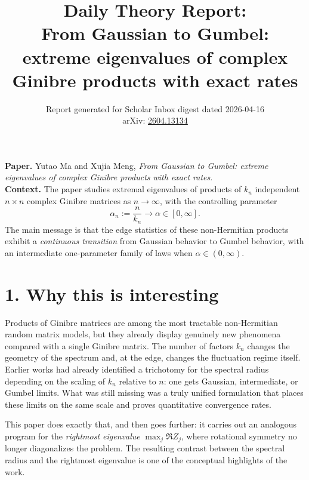 \documentclass[11pt]{article}
\title{\vspace{-1.5em}\textbf{Daily Theory Report:}\\[0.25em]
From Gaussian to Gumbel: extreme eigenvalues of complex Ginibre products with exact rates}
\author{Report generated for Scholar Inbox digest dated 2026-04-16\\arXiv: \href{https://arxiv.org/abs/2604.13134}{2604.13134}}
\date{}
\begin{document}
\maketitle
\thispagestyle{empty}

\textbf{Paper.} Yutao Ma and Xujia Meng, \emph{From Gaussian to Gumbel: extreme eigenvalues of complex Ginibre products with exact rates}.\\
\textbf{Context.} The paper studies extremal eigenvalues of products of $k_n$ independent $n\times n$ complex Ginibre matrices as $n\to\infty$, with the controlling parameter
\[
\alpha_n:=\frac{n}{k_n}\longrightarrow \alpha\in[0,\infty].
\]
The main message is that the edge statistics of these non-Hermitian products exhibit a \emph{continuous transition} from Gaussian behavior to Gumbel behavior, with an intermediate one-parameter family of laws when $\alpha\in(0,\infty)$.

\section*{1. Why this is interesting}
Products of Ginibre matrices are among the most tractable non-Hermitian random matrix models, but they already display genuinely new phenomena compared with a single Ginibre matrix. The number of factors $k_n$ changes the geometry of the spectrum and, at the edge, changes the fluctuation regime itself. Earlier works had already identified a trichotomy for the spectral radius depending on the scaling of $k_n$ relative to $n$: one gets Gaussian, intermediate, or Gumbel limits. What was still missing was a truly unified formulation that places these limits on the same scale and proves quantitative convergence rates.

This paper does exactly that, and then goes further: it carries out an analogous program for the \emph{rightmost eigenvalue} $\max_j \Re Z_j$, where rotational symmetry no longer diagonalizes the problem. The resulting contrast between the spectral radius and the rightmost eigenvalue is one of the conceptual highlights of the work.
\end{document}
